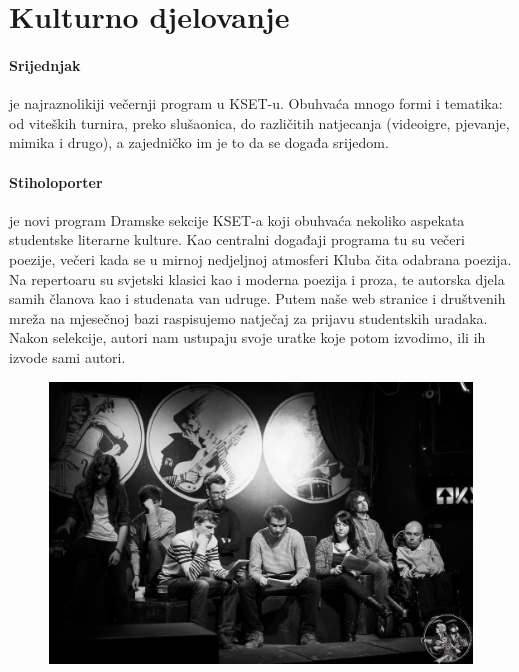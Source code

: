 \documentclass[12pt,a4paper,oneside]{article}
\begin{document}
\section*{Kulturno djelovanje}

	\paragraph{Srijednjak}je najraznolikiji večernji program u KSET-u. Obuhvaća mnogo formi i tematika: od viteških turnira, preko slušaonica, do različitih natjecanja (videoigre, pjevanje, mimika i drugo), a zajedničko im je to da se događa srijedom.

	\paragraph{Stiholoporter}je novi program Dramske sekcije KSET-a koji obuhvaća nekoliko aspekata studentske literarne kulture. Kao centralni događaji programa tu su večeri poezije, večeri kada se u mirnoj  nedjeljnoj atmosferi Kluba čita odabrana poezija. Na repertoaru su svjetski klasici kao i moderna poezija i proza, te autorska djela samih članova kao i studenata van udruge. Putem naše web stranice i društvenih mreža na mjesečnoj bazi raspisujemo natječaj za prijavu studentskih uradaka. Nakon selekcije, autori nam ustupaju svoje uratke koje potom izvodimo, ili ih izvode sami autori.
	
	\begin{figure}[h!]
		\centering
		\vspace{5mm}
		\includegraphics[scale=0.3]{stiholoporter.jpg}	
	\end{figure}
	
\end{document}
